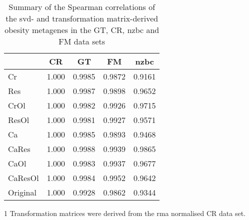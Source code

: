 \begin{table}[htpb]
	\centering
	\begin{threeparttable}
	\caption[Summary of the Spearman correlations of the \gls{svd}- and TM-derived obesity metagenes in the GT, CR, \gls{nzbc} and FM data sets]{Summary of the Spearman correlations of the \gls{svd}- and transformation matrix-derived obesity metagenes in the GT, CR, \gls{nzbc} and FM data sets}
		\label{tab:svd_vs_tm_obs}
		\begin{tabular}{lcccc}
			& CR & GT & FM & \gls{nzbc}\\
			\hline
			\hline
			\rule{0pt}{2.25ex} Cr & 1.000     & 0.9985 & 0.9872 & 0.9161 \\
			Res                   & 1.000     & 0.9987 & 0.9898 & 0.9652 \\
			CrOl                  & 1.000     & 0.9982 & 0.9926 & 0.9715 \\
			ResOl                 & 1.000     & 0.9981 & 0.9927 & 0.9571 \\
			Ca                    & 1.000     & 0.9985 & 0.9893 & 0.9468 \\
			CaRes                 & 1.000     & 0.9988 & 0.9939 & 0.9865 \\
			CaOl                  & 1.000     & 0.9983 & 0.9937 & 0.9677 \\
			CaResOl               & 1.000     & 0.9984 & 0.9952 & 0.9642 \\
			Original              & 1.000     & 0.9928 & 0.9862 & 0.9344 \\
			\hline
			\hline
		\end{tabular}
			\begin{tablenotes}
				\begin{footnotesize}
				\item [1] Transformation matrices were derived from the \gls{rma} normalised CR data set.
				\end{footnotesize}
			\end{tablenotes}
	\end{threeparttable}
\end{table}

